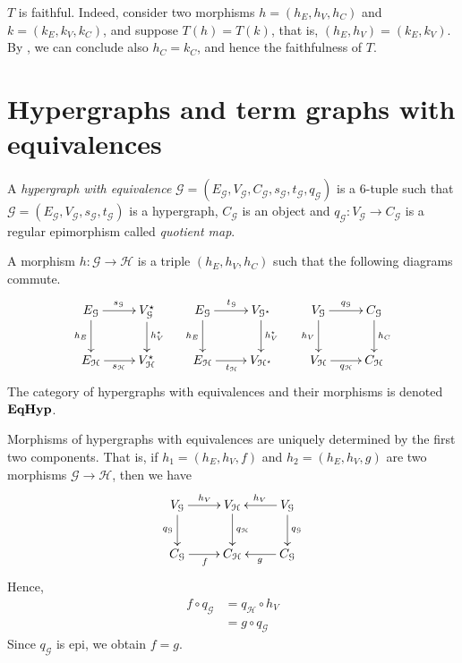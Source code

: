 \begin{remark}
	$T$ is faithful. Indeed, consider two morphisms $h = (h_E, h_V, h_C)$ and $k = (k_E, k_V, k_C)$, and suppose $T(h) = T(k)$, that is, $(h_E, h_V) = (k_E, k_V)$.
	By , we can conclude also $h_C = k_C$, and hence the faithfulness of $T$.
\end{remark}

\section{Hypergraphs and term graphs with equivalences}


\begin{definition}
	A \emph{hypergraph with equivalence} $\mathcal{G} = (E_\mathcal{G}, V_{\mathcal{G}}, C_\mathcal{G}, s_\mathcal{G}, t_\mathcal{G}, q_\mathcal{G})$ is a 6-tuple such that $\mathcal{G} = (E_\mathcal{G}, V_{\mathcal{G}}, s_\mathcal{G}, t_\mathcal{G})$ is a hypergraph, $C_\mathcal{G}$ is an object and $q_{\mathcal{G}}: V_{\mathcal{G}}\to C_{\mathcal{G}}$ is a regular epimorphism called \emph{quotient map}. 
	
	A morphism $h:\mathcal{G\to H}$ is a triple $(h_E, h_V, h_C)$ such that the following diagrams commute.
	\[\xymatrix{
		{E_\mathcal{G}}\ar[r]^{s_\mathcal{G}}\ar[d]_{h_E} & {V_{\mathcal{G}}^\star}\ar[d]^{h_V^\star} & {E_\mathcal{G}}\ar[r]^{t_\mathcal{G}}\ar[d]_{h_E} & {V_{\mathcal{G}^\star}}\ar[d]^{h_V^\star} & {V_\mathcal{G}}\ar[r]^{q_\mathcal{G}}\ar[d]_{h_V} & {C_{\mathcal{G}}} \ar[d]^{h_C} \\
		{E_\mathcal{H}}\ar[r]_{s_\mathcal{H}} & {V_{\mathcal{H}}^\star}	& {E_\mathcal{H}}\ar[r]_{t_\mathcal{H}} & {V_{\mathcal{H}^\star}}& {V_\mathcal{H}}\ar[r]_{q_\mathcal{H}} & {C_\mathcal{H}}
	}\]
	The category of hypergraphs with equivalences and their morphisms is denoted $\textbf{\textup{EqHyp}}$.

\end{definition}

\begin{remark}\label{rem:eqhyp_morphs}
	Morphisms of hypergraphs with equivalences are uniquely determined by the first two components. That is, if $h_1 = (h_E, h_V, f)$ and $h_2 = (h_E, h_V, g)$ are two morphisms $\mathcal{G \to H}$, then we have
	\[\xymatrix{
			{V_\mathcal{G}} \ar[r]^{h_V}\ar[d]_{q_\mathcal{G}} & V_\mathcal{H} \ar[d]^{q_\mathcal{H}} & V_\mathcal{G}\ar[l]_{h_V}\ar[d]^{q_\mathcal{G}}\\
			C_{\mathcal{G}}\ar[r]_{f} & C_{\mathcal{H}} & C_{\mathcal{G}}\ar[l]^{g}
	}\]
	Hence,
	\begin{align*}
		f \circ q_\mathcal{G} &= q_\mathcal{H}\circ h_V \\ &=g\circ q_\mathcal{G}
	\end{align*}
	Since $q_\mathcal{G}$ is epi, we obtain $f = g$.
\end{remark}

